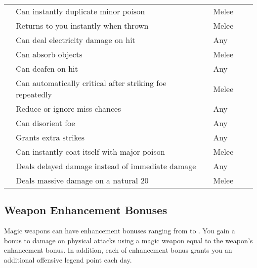 \begin{longtabuwrapper}
\begin{longtabu}{l X l l l l}
                 & Can instantly duplicate minor poison &  & Melee &  \\
                 & Returns to you instantly when thrown &  & Melee &  \\
                 & Can deal electricity damage on hit &  & Any &  \\
                 & Can absorb objects &  & Melee &  \\
                 & Can deafen on hit &  & Any &  \\
                 & Can automatically critical after striking foe repeatedly &  & Melee &  \\
                 & Reduce or ignore miss chances &  & Any &  \\
                 & Can disorient foe &  & Any &  \\
                 & Grants extra strikes &  & Any &  \\
                 & Can instantly coat itself with major poison &  & Melee &  \\
                 & Deals delayed damage instead of immediate damage &  & Any &  \\
                 & Deals massive damage on a natural 20 &  & Melee &  \\
            \end{longtabu}
        \end{longtabuwrapper}
        \twocolumn

    \subsection{Weapon Enhancement Bonuses}\label{Weapon Enhancement Bonuses}

        Magic weapons can have enhancement bonuses ranging from  to .
        You gain a bonus to damage on physical attacks using a magic weapon equal to the weapon's enhancement bonus.
        In addition, each  of enhancement bonus grants you an additional offensive legend point each day.

